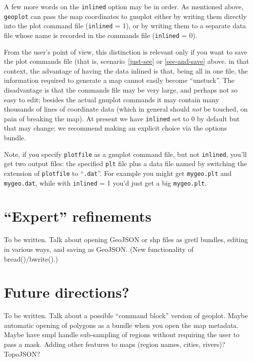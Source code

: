 \documentclass{article}
\begin{document}
A few more words on the \texttt{inlined} option may be in order. As
mentioned above, \texttt{geoplot} can pass the map coordinates to
\textsf{gnuplot} either by writing them directly into the plot command
file (\texttt{inlined} = 1), or by writing them to a separate data
file whose name is recorded in the commands file (\texttt{inlined} =
0).

From the user's point of view, this distinction is relevant only if
you want to save the plot commands file (that is,
scenario~\ref{just-see} or \ref{see-and-save} above.  in that context,
the advantage of having the data inlined is that, being all in one
file, the information required to generate a map cannot easily become
``unstuck''. The disadvantage is that the commands file may be very
large, and perhaps not so easy to edit; besides the actual
\textsf{gnuplot} commands it may contain many thousands of lines of
coordinate data (which in general should \textit{not} be touched, on
pain of breaking the map). At present we have \texttt{inlined} set to
0 by default but that may change; we recommend making an explicit
choice via the options bundle.

Note, if you specify \texttt{plotfile} as a \textsf{gnuplot} command
file, but not \texttt{inlined}, you'll get two output files: the
specified \texttt{plt} file plus a data file named by switching the
extension of \texttt{plotfile} to ``\texttt{.dat}''. For example you
might get \texttt{mygeo.plt} and \texttt{mygeo.dat}, while with
\texttt{inlined} = 1 you'd just get a big \texttt{mygeo.plt}.

\section{``Expert'' refinements}
\label{sec:expert}

To be written. Talk about opening GeoJSON or shp files as gretl
bundles, editing in various ways, and saving as GeoJSON. (New
functionality of bread()/bwrite().)

\section{Future directions?}
\label{sec:future}

To be written. Talk about a possible ``command block'' version of
geoplot. Maybe automatic opening of polygons as a bundle when you open
the map metadata. Maybe have smpl handle sub-sampling of regions
without requiring the user to pass a mask. Adding other features to
maps (region names, cities, rivers)? TopoJSON?
\end{document}
